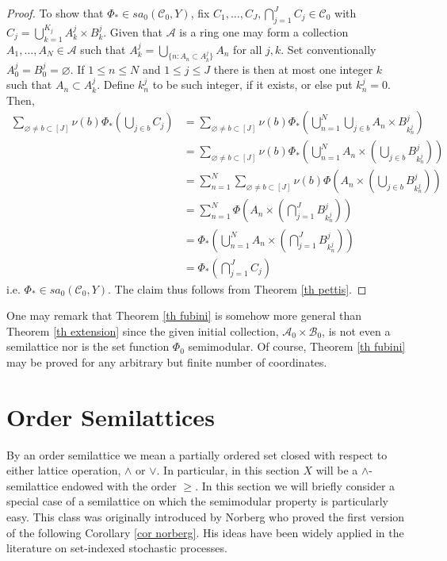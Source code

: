 \documentclass[11pt]{amsart}
\theoremstyle{plain}
\begin{document}
\begin{proof}
To show that $\Phi_*\in sa_0({\mathscr C}_0,Y)$, fix $C_1,\ldots, C_J,\bigcap_{j=1}^JC_j\in{\mathscr C}_0$ 
with $C_j=\bigcup_{k=1}^{K_j} A^j_k\times B^j_k$. Given that ${\mathscr{A}}$ is a ring one may 
form a collection $A_1,\ldots,A_N\in{\mathscr{A}}$ such that 
$A_k^j=\bigcup_{\{n:A_n\subset A_k^j\}}A_n$ for all $j,k$. Set conventionally 
$A_0^j=B_0^j={\varnothing}$. If $1\le n\le N$ and $1\le j\le J$ there is then at most one 
integer $k$ such that $A_n\subset A_k^j$. Define $k_n^j$ to be such integer, if it exists, 
or else put $k_n^j=0$. Then,
\begin{align*}
\sum_{{\varnothing}\ne b\subset[J]}\nu(b)\Phi_*\left(\bigcup_{j\in b}C_j\right)
&=\sum_{{\varnothing}\ne b\subset[J]}\nu(b)\Phi_*\left(\bigcup_{n=1}^N\bigcup_{j\in b}A_n
\times B^j_{k_n^j}\right)\\
&=\sum_{{\varnothing}\ne b\subset[J]}\nu(b)\Phi_*\left(\bigcup_{n=1}^NA_n\times
\left(\bigcup_{j\in b} B^j_{k_n^j}\right)\right)\\
&=\sum_{n=1}^N\sum_{{\varnothing}\ne b\subset[J]}\nu(b)\Phi\left(A_n\times
\left(\bigcup_{j\in b} B^j_{k_n^j}\right)\right)\\
&=\sum_{n=1}^N\Phi\left(A_n\times\left(\bigcap_{j=1}^J B^j_{k_n^j}\right)\right)\\
&=\Phi_*\left(\bigcup_{n=1}^NA_n\times\left(\bigcap_{j=1}^J B^j_{k_n^j}\right)\right)\\
&=\Phi_*\left(\bigcap_{j=1}^JC_j\right)
\end{align*} 
i.e. $\Phi_*\in sa_0({\mathscr C}_0,Y)$. The claim thus follows from Theorem \ref{th pettis}.
\end{proof}
One may remark that Theorem \ref{th fubini} is somehow more general than Theorem 
\ref{th extension} since the given initial collection, ${{\mathscr{A}}_{{0}}\times\mathscr B_{{0}}}$, is not even a semilattice 
nor is the set function $\Phi_0$ semimodular. Of course, Theorem \ref{th fubini} may 
be proved for any arbitrary but finite number of coordinates.

\section{Order Semilattices}
\label{sec order}

By an order semilattice we mean a partially ordered set closed with respect to either
lattice operation, $\wedge$ or $\vee$. In particular, in this section $X$ will be a
$\wedge$-semilattice endowed with the order $\ge$. In this section we will briefly 
consider a special case of a semilattice on which the semimodular property is particularly 
easy. This class was originally introduced by Norberg \cite{norberg} who proved the
first version of the following Corollary \ref{cor norberg}. His ideas have been
widely applied in the literature on set-indexed stochastic processes.
\end{document}
